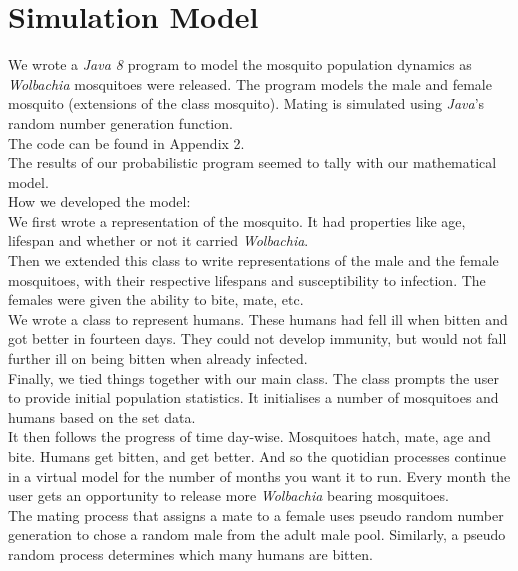 \documentclass{article}
\begin{document}
\section{Simulation Model}
We wrote a \textit{Java 8} program to model the mosquito population dynamics as \textit{Wolbachia} mosquitoes were released. The program models the male and female mosquito (extensions of the class mosquito). Mating is simulated using \textit{Java}'s random number generation function.\\

The code can be found in Appendix 2.\\

The results of our probabilistic program seemed to tally with our mathematical model.\\

How we developed the model:\\
We first wrote a representation of the mosquito. It had properties like age, lifespan and whether or not it carried \textit{Wolbachia}.\\

Then we extended this class to write representations of the male and the female mosquitoes, with their respective lifespans and susceptibility to infection. The females were given the ability to bite, mate, etc.\\

We wrote a class to represent humans. These humans had fell ill when bitten and got better in fourteen days. They could not develop immunity, but would not fall further ill on being bitten when already infected.\\

Finally, we tied things together with our main class.
The class prompts the user to provide initial population statistics. It initialises a number of mosquitoes and humans based on the set data.\\

It then follows the progress of time day-wise. Mosquitoes hatch, mate, age and bite. Humans get bitten, and get better. And so the quotidian processes continue in a virtual model for the number of months you want it to run. Every month the user gets an opportunity to release more \textit{Wolbachia} bearing mosquitoes.\\

The mating process that assigns a mate to a female uses pseudo random number generation to chose a random male from the adult male pool. Similarly, a pseudo random process determines which many humans are bitten.\\
\end{document}
